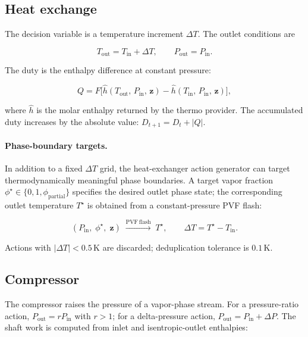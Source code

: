\documentclass[11pt,a4paper]{article}
\theoremstyle{definition}
\theoremstyle{plain}
\newcommand{\abs}[1]{\left|#1\right|}
\begin{document}
\subsection{Heat exchange}
\label{sec:hx}

The decision variable is a temperature increment $\Delta T$. The outlet conditions are

\begin{equation}
 T_{\mathrm{out}} = T_{\mathrm{in}} + \Delta T,
 \qquad
 P_{\mathrm{out}} = P_{\mathrm{in}}.
\end{equation}

The duty is the enthalpy difference at constant pressure:

\begin{equation}
 Q = F \bigl[\hat{h}(T_{\mathrm{out}},\, P_{\mathrm{in}},\,
  \bm{z}) - \hat{h}(T_{\mathrm{in}},\, P_{\mathrm{in}},\,
  \bm{z})\bigr],
\end{equation}

where $\hat{h}$ is the molar enthalpy returned by the thermo provider. The accumulated duty increases by the absolute value: $D_{t+1} = D_t + \abs{Q}$.

\paragraph{Phase-boundary targets.}
In addition to a fixed $\Delta T$ grid, the heat-exchanger action generator can target thermodynamically meaningful phase boundaries. A target vapor fraction $\phi^\star \in \{0, 1, \phi_{\mathrm{partial}}\}$ specifies the desired outlet phase state; the corresponding outlet temperature $T^\star$ is obtained from a constant-pressure PVF flash:

\begin{equation}
 (P_{\mathrm{in}},\; \phi^\star,\; \bm{z})
 \;\xrightarrow{\mathrm{PVF\,flash}}\;
 T^\star,
 \qquad \Delta T = T^\star - T_{\mathrm{in}}.
\end{equation}

Actions with $\abs{\Delta T} < 0.5\,\mathrm{K}$ are discarded; deduplication tolerance is $0.1\,\mathrm{K}$.

\subsection{Compressor}
\label{sec:compressor}

The compressor raises the pressure of a vapor-phase stream. For a pressure-ratio action, $P_{\mathrm{out}} = r P_{\mathrm{in}}$ with $r > 1$; for a delta-pressure action, $P_{\mathrm{out}} = P_{\mathrm{in}} + \Delta P$. The shaft work is computed from inlet and isentropic-outlet enthalpies:
\end{document}
